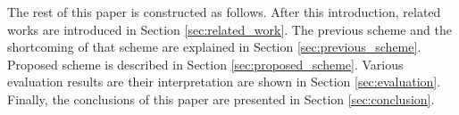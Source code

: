 The rest of this paper is constructed as follows. 
After this introduction, related works are introduced in Section \ref{sec:related_work}.
The previous scheme and the shortcoming of that scheme are explained in Section \ref{sec:previous_scheme}.
Proposed scheme is described in Section \ref{sec:proposed_scheme}.
Various evaluation results are their interpretation are shown in Section \ref{sec:evaluation}.
Finally, the conclusions of this paper are presented in Section \ref{sec:conclusion}.

